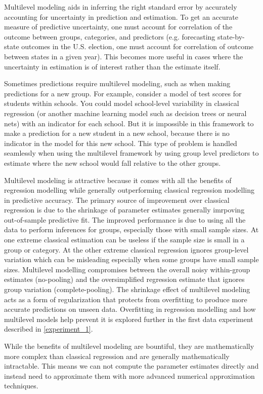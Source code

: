 Multilevel modeling aids in inferring the right standard error by accurately accounting for uncertainty in prediction and estimation. To get an accurate measure of predictive uncertainty, one must account for correlation of the outcome between groups, categories, and predictors (e.g. forecasting state-by-state outcomes in the U.S. election, one must account for correlation of outcome between states in a given year). This becomes more useful in cases where the uncertainty in estimation is of interest rather than the estimate itself.

Sometimes predictions require multilevel modeling, such as when making predictions for a new group. For example, consider a model of test scores for students within schools. You could model school-level variability in classical regression (or another machine learning model such as decision trees or neural nets) with an indicator for each school. But it is impossible in this framework to make a prediction for a new student in a new school, because there is no indicator in the model for this new school. This type of problem is handled seamlessly when using the multilevel framework by using group level predictors to estimate where the new school would fall relative to the other groups.

Multilevel modeling is attractive because it comes with all the benefits of regression modelling while generally outperforming classical regression modelling in predictive accuracy. The primary source of improvement over classical regression is due to the shrinkage of parameter estimates generally imrpoving out-of-sample predictive fit. The improved performance is due to using all the data to perform inferences for groups, especially those with small sample sizes. At one extreme classical estimation can be useless if the sample size is small in a group or category. At the other extreme classical regression ignores group-level variation which can be misleading especially when some groups have small sample sizes. Multilevel modelling compromises between the overall noisy within-group estimates (no-pooling) and the oversimplified regression estimate that ignores group variation (complete-pooling). The shrinkage effect of multilevel modeling acts as a form of regularization that protects from overfitting to produce more accurate predictions on unseen data. Overfitting in regression modelling and how multilevel models help prevent it is explored further in the first data experiment described in \ref{experiment_1}.

While the benefits of multilevel modeling are bountiful, they are mathematically more complex than classical regression and are generally mathematically intractable. This means we can not compute the parameter estimates directly and instead need to approximate them with more advanced numerical approximation techniques.

